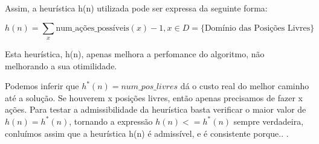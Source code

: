 \documentclass[12pt,a4paper]{article}
\begin{document}
  Assim, a heurística h(n) utilizada pode ser expressa da seguinte forma:
  
  $$
  h(n) = \sum_x {\text{num\_ações\_possíveis}(x) -1} , x \in D = \{\text{Domínio das Posições Livres}\}
  $$

  
  Esta heurística, h(n), apenas melhora a perfomance do algoritmo, não melhorando a sua otimilidade.

  Podemos inferir que $h^*(n) = num\_pos\_livres$ dá o custo real do melhor caminho até a solução. Se houverem x posições livres, então apenas precisamos de fazer x ações.
  Para testar a admissibilidade da heurística basta verificar o maior valor de $h(n) = h^*(n)$, tornando a expressão $h(n) <= h^*(n)$ sempre verdadeira,
  conluímos assim que a heurística h(n) é admissível, e é consistente porque.. .
\end{document}
